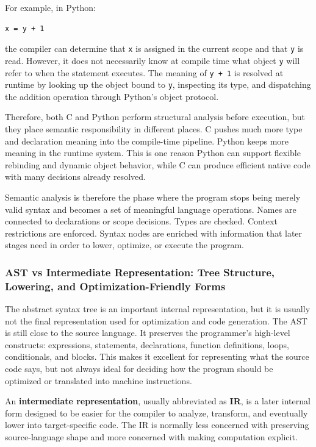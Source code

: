 For example, in Python:

\begin{verbatim}
x = y + 1
\end{verbatim}

the compiler can determine that \texttt{x} is assigned in the current scope and that \texttt{y} is read. However, it does not necessarily know at compile time what object \texttt{y} will refer to when the statement executes. The meaning of \texttt{y + 1} is resolved at runtime by looking up the object bound to \texttt{y}, inspecting its type, and dispatching the addition operation through Python's object protocol.

Therefore, both C and Python perform structural analysis before execution, but they place semantic responsibility in different places. C pushes much more type and declaration meaning into the compile-time pipeline. Python keeps more meaning in the runtime system. This is one reason Python can support flexible rebinding and dynamic object behavior, while C can produce efficient native code with many decisions already resolved.

Semantic analysis is therefore the phase where the program stops being merely valid syntax and becomes a set of meaningful language operations. Names are connected to declarations or scope decisions. Types are checked. Context restrictions are enforced. Syntax nodes are enriched with information that later stages need in order to lower, optimize, or execute the program.



\subsubsection{AST vs Intermediate Representation: Tree Structure, Lowering, and Optimization-Friendly Forms}

The abstract syntax tree is an important internal representation, but it is usually not the final representation used for optimization and code generation. The AST is still close to the source language. It preserves the programmer's high-level constructs: expressions, statements, declarations, function definitions, loops, conditionals, and blocks. This makes it excellent for representing what the source code says, but not always ideal for deciding how the program should be optimized or translated into machine instructions.

An \textbf{intermediate representation}, usually abbreviated as \textbf{IR}, is a later internal form designed to be easier for the compiler to analyze, transform, and eventually lower into target-specific code. The IR is normally less concerned with preserving source-language shape and more concerned with making computation explicit.

